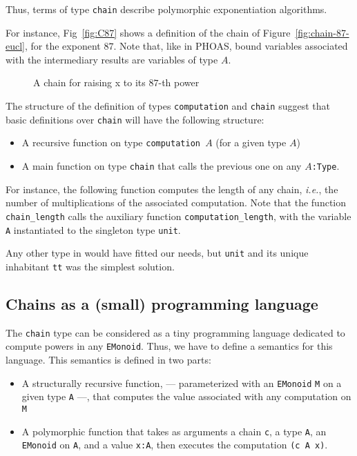 


Thus, terms of type \texttt{chain} describe polymorphic 
exponentiation algorithms. 


For instance, Fig~\vref{fig:C87} shows a definition of the chain  of Figure~\ref{fig:chain-87-eucl}, for the exponent $87$.
Note that, like in PHOAS, bound variables associated with the 
intermediary results are \coq{} variables of type $A$.
\begin{figure}[h]
  \centering
   \caption{A chain for raising x to its $87$-th power}
  \label{fig:C87}
\end{figure}



The structure of the definition of types \texttt{computation}   and \texttt{chain} suggest that basic definitions over \texttt{chain} will have the following structure:
\begin{itemize}
\item A recursive function on type \texttt{computation $A$} (for a given
    type $A$)
\item A main function on type \texttt{chain} that calls the previous one on 
any \texttt{$A$:Type}.
\end{itemize}

For instance, the following function computes the length of any chain,
\emph{i.e.}, the number of multiplications of the associated computation.
Note that the function \texttt{chain\_length} calls the auxiliary function
\texttt{computation\_length}, with the variable \texttt{A} instantiated to the singleton type  \texttt{unit}. 

Any other type in \coq{} would have fitted our needs, but \texttt{unit} and
its unique inhabitant \texttt{tt} was the simplest  solution.

\label{C87-length}


\subsection{Chains as a (small) programming language}

The \texttt{chain} type can be considered as a tiny programming language dedicated to compute powers in any \texttt{EMonoid}. Thus, we have to define a semantics for this language. This semantics is defined in two parts:
\begin{itemize}
\item A structurally recursive function,  --- parameterized with an \texttt{EMonoid} \texttt{M} on a given type \texttt{A} ---, that computes the value associated with any computation on \texttt{M}
\item A polymorphic function that takes as arguments  a  chain \texttt{c},
 a type \texttt{A},  an \texttt{EMonoid} on \texttt{A}, and 
   a value \texttt{x:A},
  then executes the computation \texttt{(c A x)}.
\end{itemize}

